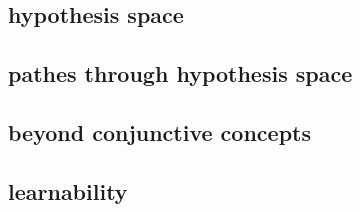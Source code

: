 \documentclass[cheatsheet.tex]{subfiles}
\begin{document}
\subsection{hypothesis space}
\lipsum[1-2]
\subsection{pathes through hypothesis space}
\lipsum[1-2]
\subsection{beyond conjunctive concepts}
\lipsum[1-2]
\subsection{learnability}
\lipsum[1-2]
\end{document}
